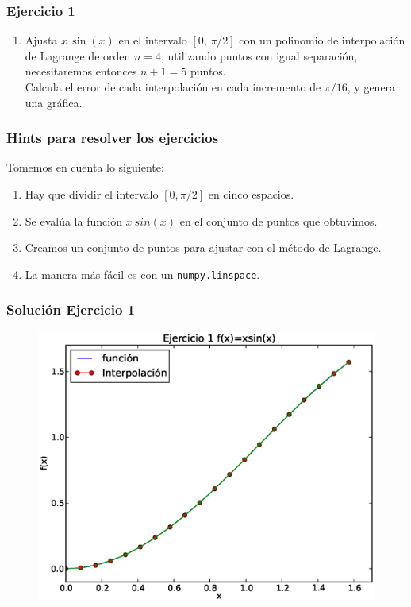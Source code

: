 \documentclass[12pt]{beamer}
\begin{document}
\begin{frame}
\frametitle{Ejercicio 1}
\begin{enumerate}[<+->]
\item Ajusta $x \, \sin(x)$ en el intervalo $[0, \, \pi/2]$ con un polinomio de interpolación de Lagrange de orden $n = 4$, utilizando puntos con igual separación, necesitaremos entonces $n + 1 = 5$ puntos.
\\
\bigskip
Calcula el error de cada interpolación en cada incremento de $\pi/16$, y genera una gráfica.
\seti
\end{enumerate}
\end{frame}
\begin{frame}[fragile]
\frametitle{Hints para resolver los ejercicios}
Tomemos en cuenta lo siguiente:
\begin{enumerate}[<+->]
\item Hay que dividir el intervalo $[0, \pi/2]$ en cinco espacios.
\item Se evalúa la función $x \: sin (x)$ en el conjunto de puntos que obtuvimos.
\item Creamos un conjunto de puntos para ajustar con el método de Lagrange.
\item La manera más fácil es con un \texttt{numpy.linspace}.
\end{enumerate}
\end{frame}    
\begin{frame}
\frametitle{Solución Ejercicio 1}
\begin{figure}
	\centering
	\includegraphics[scale=0.45]{Imagenes/ejercicioTema21_1.eps} 
\end{figure}
\end{frame}
\end{document}
